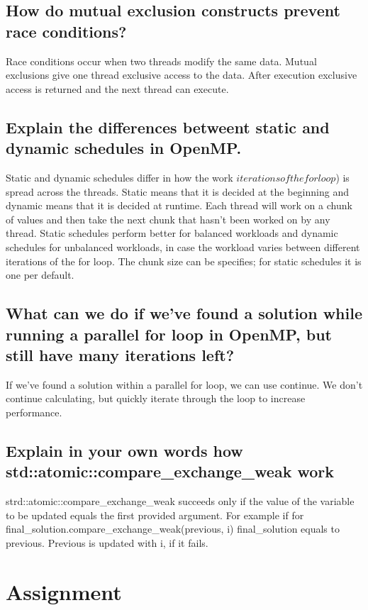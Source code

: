 \documentclass[runningheads]{llncs}
\begin{document}
\subsection{How do mutual exclusion constructs prevent race conditions?}
Race conditions occur when two threads modify the same data. Mutual exclusions give one thread exclusive access to the data. 
After execution exclusive access is returned and the next thread can execute.

\subsection{Explain the differences betweent static and dynamic schedules in OpenMP.}
Static and dynamic schedules differ in how the work \( iterations of the for loop \)) is spread across the threads. 
Static means that it is decided at the beginning and dynamic means that it is decided at runtime. 
Each thread will work on a chunk of values and then take the next chunk that hasn't been worked on by any thread.
Static schedules perform better for balanced workloads and dynamic schedules for unbalanced workloads, 
in case the workload varies between different iterations of the for loop.
The chunk size can be specifies; for static schedules it is one per default.

\subsection{What can we do if we've found a solution while running a parallel for loop in OpenMP, but still have many iterations left?}
If we've found a solution within a parallel for loop, we can use continue. We don't continue calculating, 
but quickly iterate through the loop to increase performance.


\subsection{Explain in your own words how std::atomic::compare\_exchange\_weak work}
strd::atomic::compare\_exchange\_weak  succeeds only if the value of the variable to be updated equals the first provided argument.
For example if for final\_solution.compare\_exchange\_weak(previous, i) final\_solution equals to previous. 
Previous is updated with i, if it fails.

\section{Assignment}
\end{document}
